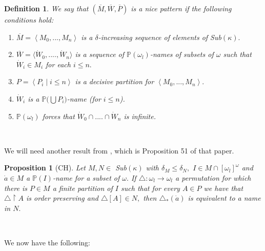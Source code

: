\documentclass{article}%
\newtheorem{definition}[theorem]{Definition}
\newtheorem{proposition}[theorem]{Proposition}
\begin{document}
\begin{definition}
We say that $\left(  \overline{M},\overline{W},\overline{P}\right)  $ is a
\emph{nice pattern }if the following conditions hold:

\begin{enumerate}
\item $\overline{M}=\left\langle M_{0},...,M_{n}\right\rangle $ is a $\delta
$-increasing sequence of elements of \textsf{Sub}$\left(  \kappa\right)  .$

\item $\overline{W}=\langle\dot{W}_{0},....,\dot{W}_{n}\rangle$ is a sequence
of $\mathbb{P}\left(  \omega_{l}\right)  $-names of subsets of $\omega$ such
that $\dot{W}_{i}\in M_{i}$ for each $i\leq n.$

\item $P=\left\langle P_{i}\mid i\leq n\right\rangle $ is a decisive partition
for $\left\langle M_{0},...,M_{n}\right\rangle .$

\item $\dot{W}_{i}$ is a $\mathbb{P(}\bigcup P_{i}\mathbb{)}$-name (for $i\leq
n$).

\item $\mathbb{P}\left(  \omega_{l}\right)  $ forces that $\dot{W}_{0}%
\cap....\cap\dot{W}_{n}$ is infinite.
\end{enumerate}
\end{definition}

\qquad\ \qquad\ \ \ 

We will need another result from \cite{UltrafiltersinRandomModel}, which is
Proposition 51 of that paper.

\begin{proposition}
[\textsf{CH}]Let $M,N\in$ \textsf{Sub}$\left(  \kappa\right)  $ with
$\delta_{M}\leq\delta_{N},$ $I\in M\cap\left[  \omega_{l}\right]  ^{\omega}$
and $\dot{a}\in M$ a $\mathbb{P}\left(  I\right)  $-name for a subset of
$\omega.$ If $\triangle:\omega_{l}\longrightarrow\omega_{l}$ a permutation for
which there is $P\in M$ a finite partition of $I$ such that for every $A\in P$
we have that $\triangle\upharpoonright A$ is order preserving and
$\triangle\left[  A\right]  \in N,$ then $\triangle_{\ast}\left(  \dot
{a}\right)  $ is equivalent to a name in $N.$\label{prop mandar nombres}\qquad\ \ \ 
\end{proposition}

\qquad\ \ \ \ \ \ \ 

We now have the following:
\end{document}
